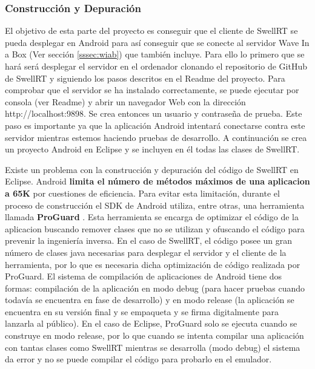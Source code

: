 	 	\subsubsection{Construcción y Depuración} \label{sssec:consDep}
	
	El objetivo de esta parte del proyecto es conseguir que el cliente de SwellRT se pueda desplegar en Android para así conseguir que se conecte al servidor Wave In a Box (Ver sección \ref{sssec:wiab}) que también incluye. Para ello lo primero que se hará será desplegar el servidor en el ordenador clonando el repositorio de GitHub \cite{ref:swellRT_github} de SwellRT y siguiendo los pasos descritos en el Readme del proyecto. Para comprobar que el servidor se ha instalado correctamente, se puede ejecutar por consola (ver Readme) y abrir un navegador Web con la dirección http://localhost:9898. Se crea entonces un usuario y contraseña de prueba. Este paso es importante ya que la aplicación Android intentará conectarse contra este servidor mientras estemos haciendo pruebas de desarrollo. A continuación se crea un proyecto Android en Eclipse y se incluyen en él todas las clases de SwellRT. 
	  
	  Existe un problema con la construcción y depuración del código de SwellRT en Eclipse. Android \textbf{limita el número de métodos máximos de una aplicacion a 65K} \cite{ref:android_limit65k} por cuestiones de eficiencia. Para evitar esta limitación, durante el proceso de construcción el SDK de Android utiliza, entre otras, una herramienta llamada \textbf{ProGuard} \cite{ref:android_proguard}. Esta herramienta se encarga de optimizar el código de la aplicacion buscando remover clases que no se utilizan y ofuscando el código para prevenir la ingeniería inversa. En el caso de SwellRT, el código posee un gran número de clases java necesarias para desplegar el servidor y el cliente de la herramienta, por lo que es necesaria dicha optimización de código realizada por ProGuard. El sistema de compilación de aplicaciones de Android tiene dos formas: compilación de la aplicación en modo debug (para hacer pruebas cuando todavía se encuentra en fase de desarrollo) y en modo release (la aplicación se encuentra en su versión final y se empaqueta y se firma digitalmente para lanzarla al público). En el caso de Eclipse, ProGuard solo se ejecuta cuando se construye en modo release, por lo que cuando se intenta compilar una aplicación con tantas clases como SwellRT mientras se desarrolla (modo debug) el sistema da error y no se puede compilar el código para probarlo en el emulador.

